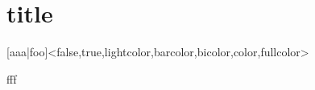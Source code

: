 \documentclass[english,ngerman,ttfont=roboto,cd=foo]{tudscrmanual}
\begin{document}
\section{title}

\newcommand*\cdalias{false,true,lightcolor,barcolor,bicolor,color,fullcolor}

\begin{Declaration}{}[aaa|foo]<\cdalias>
\printdeclarationlist%

fff
\end{Declaration}
\end{document}
